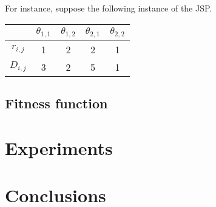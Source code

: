 \documentclass[10pt,a4paper]{article}
\begin{document}
For instance, suppose the following instance of the JSP.
\begin{table}
\begin{tabular}{|c|c|c|c|c|}
\hline 
& $\theta_{1,1}$ & $\theta_{1,2}$ & $\theta_{2,1}$ & $\theta_{2,2}$ \\
\hline
$r_{i,j}$ & 1 & 2 & 2 & 1 \\
$D_{i,j}$ & 3 & 2 & 5 & 1 \\
\hline
\end{tabular}
\end{table}

\subsection{Fitness function}

\section{Experiments}
\section{Conclusions}



\end{document}
